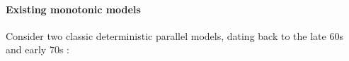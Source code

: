 

\paragraph{Existing monotonic models}

Consider two classic deterministic parallel models,
dating back to the late 60s and early 70s \cite{Tesler-1968,Kahn-1974}:



